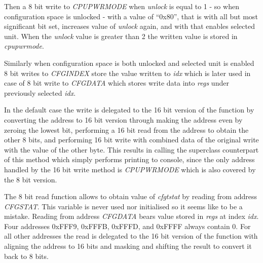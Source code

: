 Then a 8 bit write to \emph{CPUPWRMODE} when \emph{unlock} is equal to 1 -  so
when configuration space is unlocked - with a value of ``0x80'', that is with all
but most significant bit set, increases value of \emph{unlock} again, and with
that enables selected unit. When the \emph{unlock} value is greater than 2 the
written value is stored in \emph{cpupwrmode}.

\begin{codeblock}
    
\end{codeblock}

Similarly when configuration space is both unlocked and selected unit is
enabled 8 bit writes to \emph{CFGINDEX} store the value written to \emph{idx}
which is later used in case of 8 bit write to \emph{CFGDATA} which stores write
data into \emph{regs} under previously selected \emph{idx}.

\begin{codeblock}
    
\end{codeblock}

In the default case the write is delegated to the 16 bit version of the
function by converting the address to 16 bit version through making the address
even by zeroing the lowest bit, performing a 16 bit read from the address to
obtain the other 8 bits, and performing 16 bit write with combined data of the
original write with the value of the other byte. This results in calling the
superclass counterpart of this method which simply performs printing to
console, since the only address handled by the 16 bit write method is
\emph{CPUPWRMODE} which is also covered by the 8 bit version.

The 8 bit read function allows to obtain value of \emph{cfgtstat} by reading
from address \emph{CFGSTAT}. This variable is never used nor initialised so it
seems like to be a mistake. Reading from address \emph{CFGDATA} bears value
stored in \emph{regs} at index \emph{idx}. Four addresses 0xFFF9, 0xFFFB,
0xFFFD, and 0xFFFF always contain 0. For all other addresses the read is
delegated to the 16 bit version of the function with aligning the address to 16
bits and masking and shifting the result to convert it back to 8 bits.

\begin{codeblock}
    
\end{codeblock}

